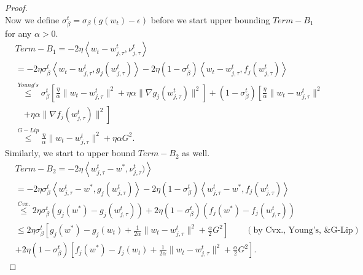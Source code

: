 \documentclass{article} %
\begin{document}
\begin{proof}
\begin{equation*}
\end{equation*}
Now we define $\sigma_{\beta}^t = \sigma_{\beta}(g(w_t) - \epsilon)$ before we start upper bounding $Term-B_1$ for any $\alpha>0$.
\begin{equation*}
    \begin{aligned}
        &Term-B_1 = - 2\eta \left\langle w_t - w_{j,\tau}^t , \nu_{j,\tau}^t \right\rangle 
        \\
        &= - 2\eta \sigma_{\beta}^t \left\langle w_t - w_{j,\tau}^t , g_j(w_{j,\tau}^t) \right\rangle  - 2\eta (1 - \sigma_{\beta}^t) \left\langle w_t - w_{j,\tau}^t , f_j(w_{j,\tau}^t) \right\rangle
        \\
        &\overset{Young's}{\leq} \sigma_{\beta}^t\left[ \frac{\eta}{\alpha} \| w_t - w_{j,\tau}^t \|^2 + \eta \alpha \| \nabla g_j(w_{j,\tau}^t) \|^2\right] + (1 -  \sigma_{\beta}^t)\left[\frac{\eta}{\alpha} \| w_t - w_{j,\tau}^t \|^2 \right.
        \\
        & \quad \left. + \eta \alpha \| \nabla f_j(w_{j,\tau}^t) \|^2\right]
        \\
        &\overset{G-Lip}{\leq}\frac{\eta}{\alpha} \| w_t - w_{j,\tau}^t \|^2 + \eta \alpha G^2.
    \end{aligned}
\end{equation*}
Similarly, we start to upper bound $Term-B_2$ as well.
\begin{equation*}
    \begin{aligned}
        &Term-B_2 = - 2\eta\left\langle w_{j,\tau}^t - w^*, \nu_{j,\tau}^t ) \right\rangle
        \\
        &= - 2\eta \sigma_{\beta}^t \left\langle w_{j,\tau}^t - w^* , g_j(w_{j,\tau}^t) \right\rangle  - 2\eta (1 - \sigma_{\beta}^t) \left\langle w_{j,\tau}^t - w^* , f_j(w_{j,\tau}^t) \right\rangle
        \\
        &\overset{Cvx.}{\leq} 2\eta \sigma_{\beta}^t \left( g_j(w^*) - g_j(w_{j,\tau}^t) \right) + 2\eta (1 - \sigma_{\beta}^t) \left( f_j(w^*) - f_j(w_{j,\tau}^t) \right)
        \\
        & {\leq} 2\eta \sigma_{\beta}^t \left[g_j(w^*) - g_j(w_t) + \frac{1}{2\alpha} \| w_t - w_{j,\tau}^t \|^2 + \frac{\alpha}{2}G^2\right] \qquad(\text{by Cvx., Young's, \& G-Lip})
        \\
        &+ 2\eta (1 - \sigma_{\beta}^t) \left[f_j(w^*) - f_j(w_t) + \frac{1}{2\alpha} \| w_t - w_{j,\tau}^t \|^2 + \frac{\alpha}{2}G^2\right].
    \end{aligned}
\end{equation*}

\end{proof}
\end{document}
